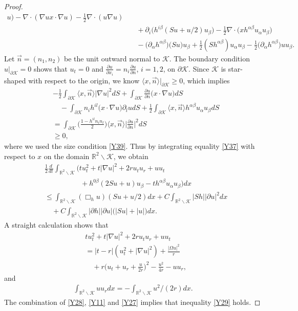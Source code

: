 \documentclass[10pt,a4paper]{amsart}
\def\geq{\geqslant}
\def\leq{\leqslant}
\begin{document}
\begin{proof}
\begin{align}
u)-\nabla\cdot(\nabla ux\cdot\nabla
u)-\frac12\nabla\cdot(u\nabla u)\nonumber\\&\quad+
\partial_i\big(h^{i\beta}(Su+u/2)u_{\beta}\big)
-\frac12\nabla\cdot\big(xh^{\alpha\beta}u_{\alpha}u_{\beta}\big)
\nonumber\\&\quad-\big(\partial_{\alpha}h^{\alpha\beta}\big)\big(Su\big)u_{\beta}
+\frac12(Sh^{\alpha\beta})u_{\alpha}u_{\beta}-\frac12\big(\partial_{\alpha}h^{\alpha\beta}\big)uu_{\beta}.
\end{align}
Let $\vec{n}=(n_1,n_2)$ be the unit outward normal to $\mathcal
{K}$. The boundary condition $u|_{\partial\mathcal {K}}=0$ shows
that $u_t=0$ and $\frac{\partial u}{\partial x_i}=n_i\frac{\partial
u}{\partial n}$, $i=1,2$, on $\partial\mathcal {K}$. Since $\mathcal
{K}$ is star-shaped with respect to the origin, we know $\langle
x,\vec{n}\rangle|_{\partial\mathcal {K}}\geq0$, which implies
\begin{align*}
&-\frac12\int_{\partial\mathcal {K}}\langle x,\vec{n}\rangle|\nabla u|^2dS
+\int_{\partial\mathcal {K}}\frac{\partial u}{\partial n}\big(x\cdot\nabla u\big)dS
\\&\quad-\int_{\partial\mathcal {K}}n_ih^{il}\big(x\cdot\nabla u\big)\partial_ludS
+\frac12\int_{\partial\mathcal {K}}\langle x,\vec{n}\rangle h^{\alpha\beta}u_{\alpha}u_{\beta}dS
\\&=\int_{\partial\mathcal {K}}\Big(\frac{1-h^{il}n_in_l}2\Big)\langle x,\vec{n}\rangle\Big|\frac{\partial u}{\partial n}\Big|^2dS\\
&\geq0,
\end{align*}
where we used the size condition \eqref{Y39}.
Thus by integrating equality \eqref{Y37} with respect to $x$ on the
domain $\mathbb R^2\backslash\mathcal {K}$, we obtain
\begin{align}\label{Y28}
&\frac12\frac{d}{dt}\int_{\mathbb R^2\backslash\mathcal {K}}(tu_t^2+t|\nabla
u|^2+2ru_tu_r+uu_t\nonumber\\&\qquad\qquad\quad+h^{0\beta}(2Su+u)u_{\beta}-th^{\alpha\beta}u_{\alpha}u_{\beta})dx
\nonumber\\&\leq\int_{\mathbb R^2\backslash\mathcal {K}}(\Box_h
u)(Su+u/2)dx+C\int_{\mathbb R^2\backslash\mathcal {K}}|Sh||\partial u|^2dx
\nonumber\\&\quad+C\int_{\mathbb R^2\backslash\mathcal {K}}|\partial h||\partial u|\big(|Su|+|u|\big)dx.
\end{align}
A straight calculation shows that
\begin{align}\label{Y11}
&tu_t^2+t|\nabla u|^2+2ru_tu_r+uu_t\nonumber\\&=|t-r|(u_t^2+|\nabla
u|^2)+\frac{|\Omega u|^2}r\nonumber\\&\quad+r\Big(u_t+u_r+\frac
u{2r}\Big)^2-\frac {u^2}{4r}-uu_r,
\end{align}
and
\begin{align}\label{Y27}
\int_{\mathbb R^2\backslash\mathcal
{K}}uu_rdx=-\int_{\mathbb R^2\backslash\mathcal {K}}u^2/(2r)dx.
\end{align}
The combination of \eqref{Y28}, \eqref{Y11} and \eqref{Y27} implies
that inequality \eqref{Y29} holds.
\end{proof}
\end{document}
